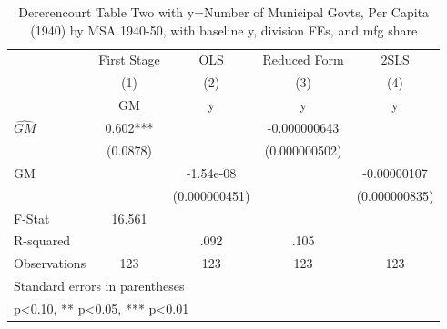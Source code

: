 \begin{table}[htbp]\centering
\def\sym#1{\ifmmode^{#1}\else\(^{#1}\)\fi}
\caption{Dererencourt Table Two with y=Number of Municipal Govts, Per Capita (1940) by MSA 1940-50, with baseline y, division FEs, and mfg share}
\begin{tabular}{l*{4}{c}}
\toprule
                    & First Stage   &         OLS   &Reduced Form   &        2SLS   \\
                    &\multicolumn{1}{c}{(1)}&\multicolumn{1}{c}{(2)}&\multicolumn{1}{c}{(3)}&\multicolumn{1}{c}{(4)}\\
                    &\multicolumn{1}{c}{GM}&\multicolumn{1}{c}{y}&\multicolumn{1}{c}{y}&\multicolumn{1}{c}{y}\\
\midrule
$\hat{GM}$          &       0.602***&               &-0.000000643   &               \\
                    &    (0.0878)   &               &(0.000000502)   &               \\
\addlinespace
GM                  &               &   -1.54e-08   &               & -0.00000107   \\
                    &               &(0.000000451)   &               &(0.000000835)   \\
\midrule
F-Stat              &      16.561   &               &               &               \\
R-squared           &               &        .092   &        .105   &               \\
Observations        &         123   &         123   &         123   &         123   \\
\bottomrule
\multicolumn{5}{l}{\footnotesize Standard errors in parentheses}\\
\multicolumn{5}{l}{\footnotesize * p<0.10, ** p<0.05, *** p<0.01}\\
\end{tabular}
\end{table}
